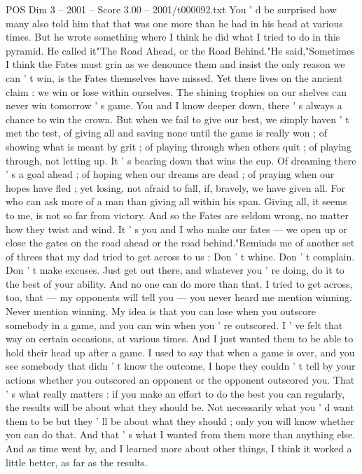 \begin{textsample}{POS Dim 3 – 2001 – Score 3.00 – 2001/t000092.txt}
You ' d be surprised how many also told him that that was one more than he had in his head at various times.
But he wrote something where I think he did what I tried to do in this pyramid.
He called it"The Road Ahead, or the Road Behind."He said,"Sometimes I think the Fates must grin as we denounce them and insist the only reason we can ' t win, is the Fates themselves have missed.
Yet there lives on the ancient claim : we win or lose within ourselves.
The shining trophies on our shelves can never win tomorrow ' s game.
You and I know deeper down, there ' s always a chance to win the crown.
But when we fail to give our best, we simply haven ' t met the test, of giving all and saving none until the game is really won ; of showing what is meant by grit ; of playing through when others quit ; of playing through, not letting up.
It ' s bearing down that wins the cup.
Of dreaming there ' s a goal ahead ; of hoping when our dreams are dead ; of praying when our hopes have fled ; yet losing, not afraid to fall, if, bravely, we have given all.
For who can ask more of a man than giving all within his span.
Giving all, it seems to me, is not so far from victory.
And so the Fates are seldom wrong, no matter how they twist and wind.
It ' s you and I who make our fates — we open up or close the gates on the road ahead or the road behind."Reminds me of another set of threes that my dad tried to get across to us : Don ' t whine.
Don ' t complain.
Don ' t make excuses.
Just get out there, and whatever you ' re doing, do it to the best of your ability.
And no one can do more than that.
I tried to get across, too, that — my opponents will tell you — you never heard me mention winning.
Never mention winning.
My idea is that you can lose when you outscore somebody in a game, and you can win when you ' re outscored.
I ' ve felt that way on certain occasions, at various times.
And I just wanted them to be able to hold their head up after a game.
I used to say that when a game is over, and you see somebody that didn ' t know the outcome, I hope they couldn ' t tell by your actions whether you outscored an opponent or the opponent outscored you.
That ' s what really matters : if you make an effort to do the best you can regularly, the results will be about what they should be.
Not necessarily what you ' d want them to be but they ' ll be about what they should ; only you will know whether you can do that.
And that ' s what I wanted from them more than anything else.
And as time went by, and I learned more about other things, I think it worked a little better, as far as the results.

\end{textsample}
